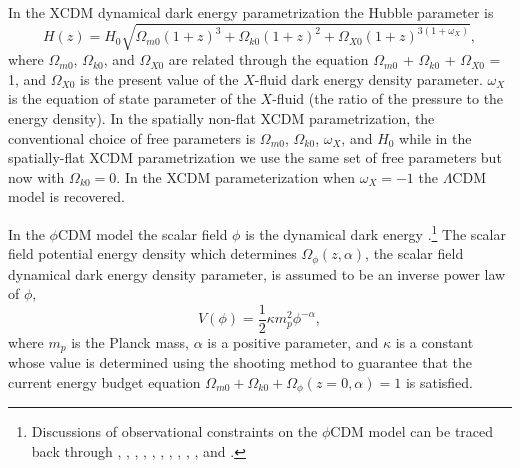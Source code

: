 \documentclass[a4paper,fleqn,usenatbib]{mnras}
\begin{document}
In the XCDM dynamical dark energy parametrization the Hubble parameter is
\begin{equation}
\label{eq:XCDM}
    H(z) = H_0\sqrt{\Omega_{m0}(1+z)^3 + \Omega_{k0}(1+z)^2 + \Omega_{X0}(1+z)^{3(1+\omega_X)}},
\end{equation}
where $\Omega_{m0}$, $\Omega_{k0}$, and $\Omega_{X0}$ are related through the equation $\Omega_{m0}$ + $\Omega_{k0}$ + $\Omega_{X0}$ = 1, and $\Omega_{X0}$ is the present value of the $X$-fluid dark energy density parameter. $\omega_X$ is the equation of state parameter of the $X$-fluid (the ratio of the pressure to the energy density). In the spatially non-flat XCDM parametrization, the conventional choice of free parameters is $\Omega_{m0}$, $\Omega_{k0}$, $\omega_X$, and $H_0$ while in the spatially-flat XCDM parametrization we use the same set of free parameters but now with $\Omega_{k0} = 0$. In the XCDM parameterization when $\omega_X = -1$ the $\Lambda$CDM model is recovered.

In the $\phi$CDM model the scalar field $\phi$ is the dynamical dark energy \citep{PeeblesRatra1988, RatraPeebles1988, Pavlovetal2013}.\footnote{Discussions of observational constraints on the $\phi$CDM model can be traced back through \cite{chen_etal_2017}, \citet{Zhaietal2017}, \citet{Oobaetal2018c, Oobaetal2019}, \citet{ParkRatra2018, ParkRatra2019c, ParkRatra2020}, \citet{Sangwanetal2018}, \citet{SolaPercaulaetal2019}, \citet{Singhetal2019}, \citet{UrenaLopezRoy2020}, \citet{SinhaBanerjee2021}, \citet{Xuetal2021}, and \citet{deCruzetal2021}.} The scalar field potential energy density which determines $\Omega_{\phi}(z, \alpha)$, the scalar field dynamical dark energy density parameter, is assumed to be an inverse power law of $\phi$,
\begin{equation}
\label{eq:phiCDMV}
    V(\phi) = \frac{1}{2}\kappa m_{p}^2 \phi^{-\alpha},
\end{equation}
where $m_{p}$ is the Planck mass, $\alpha$ is a positive parameter,  and $\kappa$ is a constant whose value is determined using the shooting method to guarantee that the current energy budget equation $\Omega_{m0} + \Omega_{k0} + \Omega_{\phi}(z = 0, \alpha) = 1$ is satisfied.
\end{document}
